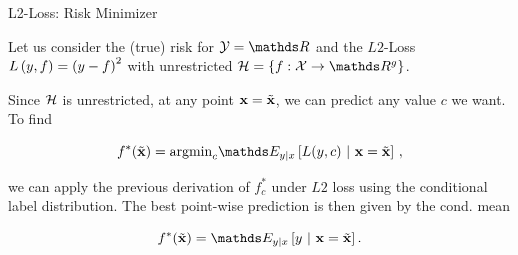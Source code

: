 \documentclass[11pt,compress,t,notes=noshow, xcolor=table]{beamer}
\begin{document}
\begin{vbframe}{L2-Loss: Risk Minimizer}

Let us consider the (true) risk for  $\Yspace = \R$ and the $L2$-Loss $L\left(y, f\right) = \left(y-f\right)^2$ with unrestricted $\Hspace = \{f: \Xspace \to \R^g\}$.

\lz

Since $\mathcal{H}$ is unrestricted, at any point $\mathbf{x} = \tilde{\mathbf{x}}$, we can predict any value $c$ we want. To find 

$$\fbayes(\xtil) = \mbox{argmin}_c \E_{y|x}\left[L(y, c)~|~ \xv = \xtil \right]\,,$$ 

we can apply the previous derivation of $f_{c}^{\ast}$ under $L2$ loss using the conditional label distribution. The best point-wise prediction is then given by the cond. mean

$$f^{\ast}(\xtil) = \E_{y|x} \left[y ~|~ \xv = \xtil \right]. $$






\end{vbframe}
\end{document}
